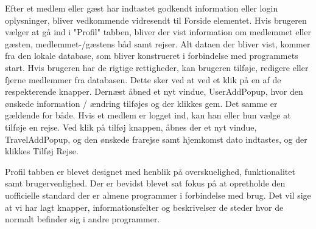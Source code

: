 Efter et medlem eller gæst har indtastet godkendt information eller login oplysninger, bliver vedkommende vidresendt til Forside elementet. Hvis brugeren vælger at gå ind i "Profil" tabben, bliver der vist information om medlemmet eller gæsten, medlemmet-/gæstens båd samt rejser. 
Alt dataen der bliver vist, kommer fra den lokale database, som bliver konstrueret i forbindelse med programmets start.
Hvis brugeren har de rigtige rettigheder, kan brugeren tilføje, redigere eller fjerne medlemmer fra databasen. Dette sker ved at ved et klik på en af de respekterende knapper. Dernæst åbned et nyt vindue, UserAddPopup, hvor den ønskede information / ændring tilføjes og der klikkes gem. Det samme er gældende for både.
Hvis et medlem er logget ind, kan han eller hun vælge at tilføje en rejse. Ved klik på tilføj knappen, åbnes der et nyt vindue, TravelAddPopup, og den ønskede frarejse samt hjemkomst dato indtastes, og der klikkes Tilføj Rejse. 

Profil tabben er blevet designet med henblik på overskuelighed, funktionalitet samt brugervenlighed. Der er bevidst blevet sat fokus på at opretholde den uofficielle standard der er almene programmer i forbindelse med brug. Det vil sige at vi har lagt knapper, informationsfelter og beskrivelser de steder hvor de normalt befinder sig i andre programmer.